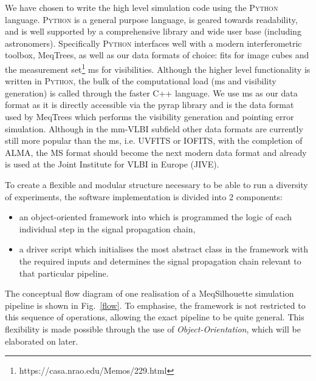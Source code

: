 We have chosen to write the high level simulation code using the \textsc{Python} language. \textsc{Python} is a general purpose language, is geared towards readability, and is well supported by a comprehensive library and wide user base (including astronomers). Specifically \textsc{Python} interfaces well with a modern interferometric toolbox, {\sc MeqTrees}, as well as our data formats of choice: {\sc fits} for image cubes and the {\sc measurement set}\footnote{https://casa.nrao.edu/Memos/229.html} {\sc ms} for visibilities. Although the higher level functionality is written in \textsc{Python}, the bulk of the computational load ({\sc ms} and visibility generation) is called through the faster {\sc C++} language. 
We use {\sc ms} as our data format as it is directly accessible via the {\sc pyrap} library and is the data format used by {\sc MeqTrees} which performs the visibility generation and pointing error simulation. Although in the mm-VLBI subfield other data formats are currently still more popular than the {\sc ms}, i.e. {\sc UVFITS} or {\sc IOFITS}, with the completion of ALMA, the MS format should become the next modern data format and already is used at the Joint Institute for VLBI in Europe (JIVE). 


To create a flexible and modular structure necessary to be able to run a diversity of experiments, the software implementation is divided into 2 components:
\begin{itemize}
 \item an object-oriented framework into which is programmed the logic of each individual step in the signal propagation chain,
 \item a driver script which initialises the most abstract class in the framework with the required inputs and determines the signal propagation chain relevant to that particular pipeline.
\end{itemize}
The conceptual flow diagram of one realisation of a {\sc MeqSilhouette} simulation pipeline is shown in Fig.~\ref{flow}. To emphasise, the framework is not restricted to this sequence of operations, allowing the exact pipeline to be quite general. This flexibility is made possible through the use of \emph{Object-Orientation}, which will be elaborated on later. 


